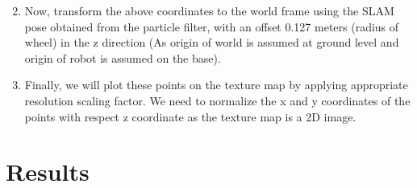 \documentclass[a4paper]{article}
\begin{document}
\begin{enumerate}
\begin{equation}
    \end{equation}
    \item Now, transform the above coordinates to the world frame using the SLAM pose obtained from the particle filter, with an offset 0.127 meters (radius of wheel) in the z direction (As origin of world is assumed at ground level and origin of robot is assumed on the base).
    \item Finally, we will plot these points on the texture map by applying appropriate resolution scaling factor. We need to normalize the x and y coordinates of the points with respect z coordinate as the texture map is a 2D image.
\end{enumerate}
\section{Results}
\end{document}
